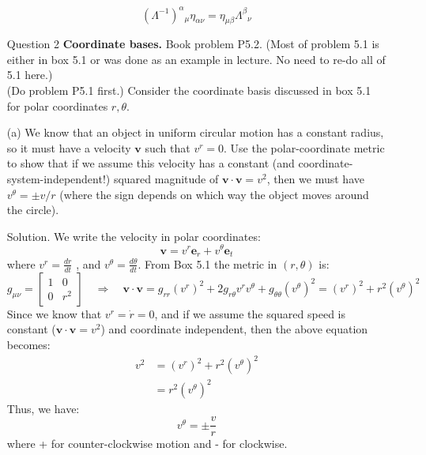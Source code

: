 \documentclass[12pt]{article}
\begin{document}
\begin{enumerate}
  $$\left(\Lambda^{-1}\right)^\alpha{ }_\mu \eta_{\alpha \nu}=\eta_{\mu \beta} \Lambda^\beta{ }_\nu$$


  \newpage





















  
  \item[Question 2] \textbf{Coordinate bases.} Book problem P5.2. (Most of problem 5.1 is either in box 5.1 or was done as an example in lecture. No need to re-do all of 5.1 here.)\\
  (Do problem P5.1 first.) Consider the coordinate basis discussed in box 5.1 for polar coordinates $r, \theta$.
    \item[(a)] We know that an object in uniform circular motion has a constant radius, so it must have a velocity $\boldsymbol{v}$ such that $v^r=0$. Use the polar-coordinate metric to show that if we assume this velocity has a constant (and coordinate-system-independent!) squared magnitude of $\boldsymbol{v} \cdot \boldsymbol{v}=v^2$, then we must have $v^\theta= \pm v / r$ (where the sign depends on which way the object moves around the circle).
    
    
    \item[Solution.]
    We write the velocity in polar coordinates:
    $$
    \mathbf{v}=v^r \mathbf{e}_r+v^\theta \mathbf{e}_t
    $$
    where $v^r=\frac{d r}{d t}$ , and $v^\theta=\frac{d \theta}{d t}$. From Box 5.1 the metric in $(r, \theta)$ is:
    $$
    g_{\mu \nu}=\left[\begin{array}{cc}
    1 & 0 \\
    0 & r^2
    \end{array}\right] \quad \Rightarrow \quad \mathbf{v} \cdot \mathbf{v}=g_{r r}\left(v^r\right)^2+2 g_{r \theta} v^r v^\theta+g_{\theta \theta}\left(v^\theta\right)^2=\left(v^r\right)^2+r^2\left(v^\theta\right)^2
    $$
    Since we know that $v^r=\dot{r}=0$, and if we assume the squared speed is constant ($\mathbf{v} \cdot \mathbf{v}=v^2$) and coordinate independent, then the above equation becomes:
    $$
    \begin{aligned}
    v^2 & =\left(v^r\right)^2+r^2\left(v^\theta\right)^2 \\
    & =r^2\left(v^\theta\right)^2
    \end{aligned}
    $$
    Thus, we have:
    $$
    v^\theta=\pm \frac{v}{r}
    $$
    where + for counter-clockwise motion and - for clockwise.
    

\end{enumerate}
\end{document}
